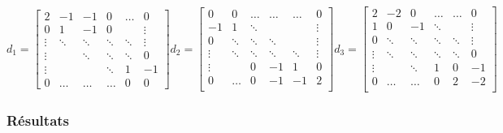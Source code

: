 \documentclass[10pt,a4paper]{article}
\numberwithin{equation}{section}
\begin{document}
\begin{equation*}
d_1=
\begin{bmatrix}
    2      & -1     & -1        & 0     &\dots      & 0 \\
    0      &  1     & -1        & 0     &           & \vdots  \\
    \vdots & \ddots & \ddots    &\ddots & \ddots    & \vdots \\
    \vdots &        & \ddots    &\ddots & \ddots    & 0 \\
    \vdots &        &           &\ddots & 1         &  -1 \\
    0      & \dots  & \dots     &\dots  & 0         &  0
\end{bmatrix}
d_2=
\begin{bmatrix}
     0     & 0      & \dots  & \dots    &\dots      & 0 \\
    -1     & 1      & \ddots &          &           & \vdots  \\
    0      & \ddots & \ddots & \ddots   &           & \vdots \\
    \vdots & \ddots & \ddots & \ddots   & \ddots    & \vdots \\
    \vdots &        & 0      &  -1      &  1        & 0\\
    0      & \dots  & 0      &  -1      & -1        & 2 \\
\end{bmatrix}
d_3=
\begin{bmatrix}
     2     & -2     & 0      & \dots    &\dots      & 0 \\
     1     & 0      & -1     & \ddots   &           & \vdots  \\
    0      & \ddots & \ddots & \ddots   & \ddots    & \vdots \\
    \vdots & \ddots & \ddots & \ddots   & \ddots    & 0 \\
    \vdots &        & \ddots &   1      &  0        & -1\\
    0      & \dots  & \dots  &   0      &  2        & -2 \\
\end{bmatrix}
\end{equation*}


\subsubsection{Résultats}
\end{document}
